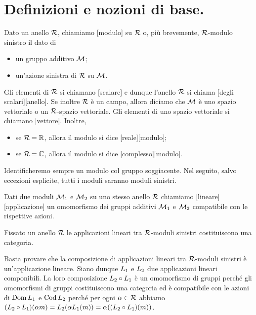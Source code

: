 \section{Definizioni e nozioni di base.}\label{DefinizioniENozioniDiBase}
\begin{Definition}
	Dato un anello $\mathcal{R}$, chiamiamo [modulo] su $\mathcal{R}$
  o, pi\`u brevemente, $\mathcal{R}$-modulo sinistro il dato di
	\begin{itemize}
		\item un gruppo additivo $\mathcal{M}$;
		\item un'azione sinistra di $\mathcal{R}$ su $\mathcal{M}$.
	\end{itemize}
	Gli elementi di $\mathcal{R}$ si chiamano
  [scalare] e dunque l'anello $\mathcal{R}$ si chiama
  [degli scalari][anello].
  Se inoltre $\mathcal{R}$ \`e un campo, allora diciamo che $\mathcal{M}$ \`e uno spazio
  vettoriale o un $\mathcal{R}$-spazio vettoriale.
  Gli elementi di uno spazio vettoriale si chiamano [vettore].
  Inoltre,
  \begin{itemize}
    \item se $\mathcal{R} = \mathbb{R}$, allora il modulo si dice
          [reale][modulo];
    \item se $\mathcal{R} = \mathbb{C}$, allora il modulo si dice
          [complesso][modulo].
  \end{itemize}
\end{Definition}
\par Identificheremo sempre un modulo col gruppo soggiacente. Nel seguito,
salvo eccezioni esplicite, tutti i moduli saranno moduli sinistri.
\begin{Definition}
	Dati due moduli $\mathcal{M}_1$ e $\mathcal{M}_2$ su uno stesso anello $\mathcal{R}$ chiamiamo [lineare][applicazione] un omomorfismo dei gruppi additivi $\mathcal{M}_1$ e $\mathcal{M}_2$ compatibile con le rispettive azioni.
\end{Definition}
\begin{Theorem}
	Fissato un anello $\mathcal{R}$ le applicazioni lineari tra $\mathcal{R}$-moduli sinistri costituiscono una categoria.
\end{Theorem}
\Proof Basta provare che la composizione di applicazioni lineari tra $\mathcal{R}$-moduli sinistri \`e un'applicazione lineare. Siano dunque $L_1$ e $L_2$ due applicazioni lineari componibili. La loro composizione $L_2 \circ L_1$ \`e un omomorfismo di gruppi perch\'e gli omomorfismi di gruppi costituiscono una categoria ed \`e compatibile con le azioni di $\operatorname{Dom}{L_1}$ e $\operatorname{Cod}{L_2}$ perch\'e per ogni $\alpha \in \mathcal{R}$ abbiamo $(L_2 \circ L_1)(\alpha m) = L_2(\alpha L_1(m)) = \alpha((L_2 \circ L_1)(m))$. \EndProof

